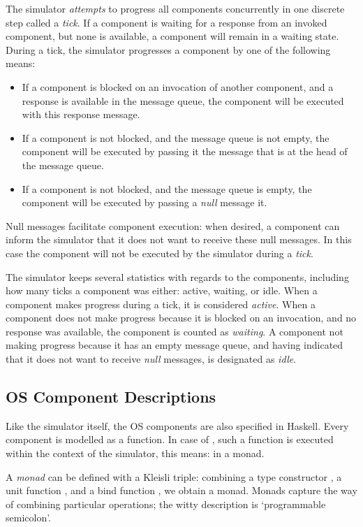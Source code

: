 The simulator \emph{attempts} to progress all components concurrently in one discrete step called a \emph{tick}.
If a component is waiting for a response from an invoked component, but none is available, a component will remain in a waiting state.
During a tick, the simulator progresses a component by one of the following means:
\begin{itemize}
  \item If a component is blocked on an invocation of another component, and a response is available in the message queue, the component will be executed with this response message.
  \item If a component is not blocked, and the message queue is not empty, the component will be executed by passing it the message that is at the head of the message queue.
  \item If a component is not blocked, and the message queue is empty, the component will be executed by passing a \emph{null} message it.
\end{itemize}
Null messages facilitate component execution:
when desired, a component can inform the simulator that it does not want to receive these null messages.
In this case the component will not be executed by the simulator during a \emph{tick}.

The simulator keeps several statistics with regards to the components, including how many ticks a component was either: active, waiting, or idle.
When a component makes progress during a tick, it is considered \emph{active}.
When a component does not make progress because it is blocked on an invocation, and no response was available, the component is counted as \emph{waiting}.
A component not making progress because it has an empty message queue, and having indicated that it does not want to receive \emph{null} messages, is designated as \emph{idle}.

\subsection{OS Component Descriptions}
Like the simulator itself, the OS components are also specified in Haskell. Every component is modelled as a function.
In case of \soosim, such a function is executed within the context of
the simulator, this means: in a monad.

A \emph{monad} can be defined with a Kleisli triple: combining a type constructor , a unit function , and a bind function , we obtain a monad.
Monads capture the way of combining particular operations; the witty description is `programmable semicolon'.

